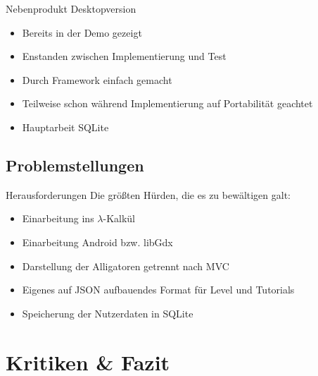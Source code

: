 \documentclass[18pt]{beamer}
\begin{document}
	\begin{frame}[<+->]{Nebenprodukt Desktopversion}
		\begin{itemize}
			\item Bereits in der Demo gezeigt
			\item Enstanden zwischen Implementierung und Test
			\item Durch Framework einfach gemacht
			\item Teilweise schon während Implementierung auf Portabilität geachtet
			\item Hauptarbeit SQLite
		\end{itemize}
	\end{frame}

	\subsection{Problemstellungen}
	\begin{frame}[<+->]{Herausforderungen}
		Die größten Hürden, die es zu bewältigen galt: 
		\begin{itemize}
			\item Einarbeitung ins $\lambda$-Kalkül
			\item Einarbeitung Android bzw. libGdx
			\item Darstellung der Alligatoren getrennt nach MVC
			\item Eigenes auf JSON aufbauendes Format für Level und Tutorials
			\item Speicherung der Nutzerdaten in SQLite
		\end{itemize}
	\end{frame}


\section{Kritiken \& Fazit}
\end{document}
